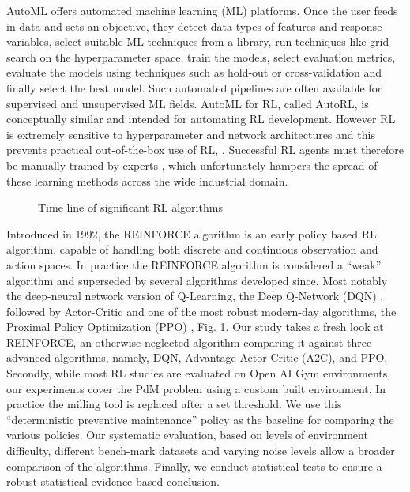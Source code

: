 \documentclass[referee, sn-mathphys-num]{sn-jnl}
\begin{document}
	AutoML offers automated machine learning (ML) platforms. Once the user feeds in data and sets an objective, they detect data types of features and response variables, select suitable ML techniques from a library, run techniques like grid-search on the hyperparameter space, train the models, select evaluation metrics, evaluate the models using techniques such as hold-out or cross-validation and finally select the best model. Such automated pipelines are often available for supervised and unsupervised ML fields. AutoML for RL, called AutoRL, is conceptually similar and intended for automating RL development. However RL is extremely sensitive to hyperparameter and network architectures and this prevents practical out-of-the-box use of RL, \cite{autorl:shala2022, autorl:afshar2022}. Successful RL agents must therefore be manually trained by experts \cite{autorl:parker2022}, which unfortunately hampers the spread of these learning methods across the wide industrial domain.
	
	\begin{figure}[hbt!]	
		\startchronology[startyear=1940, startdate=false, stopdate=false, arrow=false, color=codegray, height=.5ex]
		\stopchronology
		\vspace{-36pt}
		\caption{Time line of significant RL algorithms}
		\label{fig_TimeLine}
	\end{figure}
	Introduced in 1992, the REINFORCE algorithm \cite{REINFORCE-williams1992} is an early policy based RL algorithm, capable of handling both discrete and continuous observation and action spaces. In practice the REINFORCE algorithm is considered a ``weak'' algorithm and superseded by several algorithms developed since. Most notably the deep-neural network version of Q-Learning, the Deep Q-Network (DQN) \cite{DQN-mnih2013}, followed by Actor-Critic \cite{A2C-mnih2016} and one of the most robust modern-day algorithms, the Proximal Policy Optimization (PPO) \cite{PPO-schulman2017}, Fig. \ref{fig_TimeLine}. Our study takes a fresh look at REINFORCE, an otherwise neglected algorithm comparing it against three advanced algorithms, namely, DQN, Advantage Actor-Critic (A2C), and PPO. Secondly, while most RL studies are evaluated on Open AI Gym environments, our experiments cover the PdM problem using a custom built environment. In practice the milling tool is replaced after a set threshold. We use this ``deterministic preventive maintenance'' policy as the baseline for comparing the various policies. Our systematic evaluation, based on levels of environment difficulty, different bench-mark datasets and varying noise levels allow a broader comparison of the algorithms. Finally, we conduct statistical tests to ensure a robust statistical-evidence based conclusion.\\
	
\end{document}
